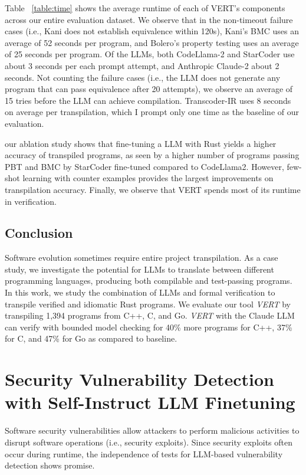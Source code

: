 \documentclass[12pt,openany,oneside,table]{cmuthesis}
\begin{document}
Table ~\ref{table:time} shows the average runtime of each of VERT's
components across our entire evaluation dataset. We observe that in
the non-timeout failure cases (i.e., Kani does not establish
equivalence within 120s), Kani's BMC uses an
average of 52 seconds per program, and Bolero's property testing uses
an average of 25 seconds per program. Of the LLMs, both CodeLlama-2 and StarCoder use about 3 seconds per each prompt attempt, and Anthropic Claude-2 about 2
seconds. Not counting the failure cases (i.e., the LLM does not
generate any program that can pass equivalence after 20 attempts), we
observe an average of 15 tries before the LLM can achieve
compilation. Transcoder-IR uses 8 seconds on average per
transpilation, which I prompt only one time as the baseline of our
evaluation.

\begin{tcolorbox}
[colback=white,colframe=black,arc=0pt,boxrule=0.5pt,title=RQ2 Summary,boxsep=2pt,left=1pt,right=1pt,top=1pt,bottom=1pt,fonttitle=\bfseries]
our ablation study shows that fine-tuning a LLM with Rust yields a higher accuracy of transpiled programs, as seen by a higher number of programs passing PBT and BMC by StarCoder fine-tuned compared to CodeLlama2.
However, few-shot learning with counter examples provides the largest improvements on transpilation accuracy. Finally, we observe that VERT spends most of its runtime in verification.
\end{tcolorbox}


\section{Conclusion}
\label{sec:vert-conclusion}
Software evolution sometimes require entire project transpilation. As a case study, we investigate the potential for LLMs to translate between different programming languages, producing both compilable and test-passing programs. 
In this work, we study the combination of LLMs and formal verification to transpile verified and idiomatic Rust programs. We evaluate our tool \textit{VERT} by transpiling 1,394 programs from C++, C, and Go. \textit{VERT} with the Claude LLM can verify with bounded model checking for 40\% more programs for C++, 37\% for C, and 47\% for Go as compared to baseline.


\chapter{Security Vulnerability Detection with Self-Instruct LLM Finetuning}
\label{ch:msivd}
Software security vulnerabilities allow attackers to perform malicious activities to disrupt software operations (i.e., security exploits). Since security exploits often occur during runtime, the independence of tests for LLM-based vulnerability detection shows promise.
\end{document}
